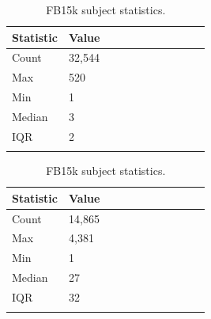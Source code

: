 \begin{table}[H]
	\parbox{.5\linewidth}{
		\centering
		\begin{tabular}{lllllllllll}
  			\textbf{Statistic} & \textbf{Value}  \\
  			\hline
			Count & 32,544 \\
			Max & 520 \\
			Min & 1 \\
  			Median & 3 \\
  			IQR & 2 \\
			&
		\end{tabular}
		\caption{WN18 subject statistics.}
		}
	\hfill
	\parbox{.5\linewidth}{
		\centering
		\begin{tabular}{lllllllllll}
  			\textbf{Statistic} & \textbf{Value}  \\
  			\hline
			Count &14,865 \\
			Max & 4,381 \\
			Min & 1 \\
  			Median & 27 \\
  			IQR & 32 \\
			&
		\end{tabular}
		\caption{FB15k subject statistics.}
		}
\end{table}


